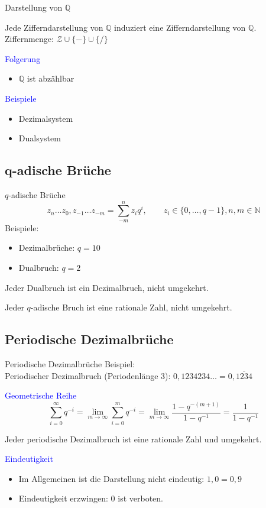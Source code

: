 \documentclass[12pt%
,aspectratio=169%
]{beamer}
\begin{document}
\begin{frame}{Darstellung von $\mathbb{Q}$}
\begin{theorem}
Jede Zifferndarstellung von $\mathbb{Q}$ induziert eine Zifferndarstellung von $\mathbb{Q}$.\\
Ziffernmenge: $\mathcal{Z} \cup \{-\} \cup \{/\}$
\end{theorem}
\textcolor{blue}{Folgerung}
\begin{itemize}
	\item $\mathbb{Q}$ ist abzählbar
\end{itemize}
\textcolor{blue}{Beispiele}
\begin{itemize}
	\item Dezimalsystem
	\item Dualsystem
\end{itemize}
\end{frame}

\subsection{q-adische Brüche}
\begin{frame}{$q$-adische Brüche}
$$
	z_n \ldots z_0, z_{-1} \ldots z_{-m} = \sum_{-m}^n z_i q^i, \qquad z_i \in \{0, \ldots, q-1\}, n,m \in \mathbb{N}
$$
Beispiele:
\begin{itemize}
	\item Dezimalbrüche: $q = 10$
	\item Dualbruch: $q = 2$
\end{itemize}
\begin{theorem}
Jeder Dualbruch ist ein Dezimalbruch, nicht umgekehrt.
\end{theorem}
\begin{theorem}
Jeder $q$-adische Bruch ist eine rationale Zahl, nicht umgekehrt.
\end{theorem}
\end{frame}

\subsection*{Periodische Dezimalbrüche}
\begin{frame}{Periodische Dezimalbrüche}
Beispiel:\\
Periodischer Dezimalbruch (Periodenlänge 3): $0,1234234 \ldots = 0,\overline{1234}$

\textcolor{blue}{Geometrische Reihe}
$$
	\sum_{i=0}^\infty q^{-i} = \lim_{m \to \infty} \sum_{i=0}^m q^{-i} = \lim_{m \to \infty} \frac{1 -q^{-(m+1)}}{1 - q^{-1}} = \frac{1}{1 - q^{-1}}
$$
\begin{theorem}
Jeder periodische Dezimalbruch ist eine rationale Zahl und umgekehrt.
\end{theorem}
\textcolor{blue}{Eindeutigkeit}
\begin{itemize}
	\item Im Allgemeinen ist die Darstellung nicht eindeutig: $1,0 = 0,9$
	\item Eindeutigkeit erzwingen: $0$ ist verboten.
\end{itemize}
\end{frame}
\end{document}
